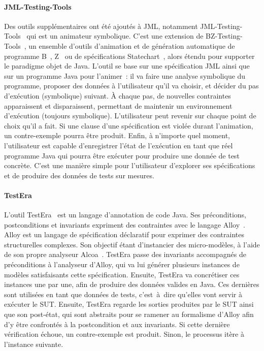 \paragraph{JML-Testing-Tools} Des outils supplémentaires ont été ajoutés à JML,
notamment JML-Testing-Tools~ qui est un animateur
symbolique. C'est une extension de BZ-Testing-Tools~, un
ensemble d'outils d'animation et de génération automatique de programme
B~, Z~ ou de spécifications
Statechart~, alors étendu pour supporter le paradigme objet de
Java. L'outil se base sur une spécification JML ainsi que sur un programme Java
pour l'animer~: il va faire une analyse symbolique du programme, proposer des
données à l'utilisateur qu'il va choisir, et décider du pas d'exécution
(symbolique) suivant. À chaque pas, de nouvelles contraintes apparaissent et
disparaissent, permettant de maintenir un environnement d'exécution (toujours
symbolique). L'utilisateur peut revenir sur chaque point de choix qu'il a fait.
Si une clause d'une spécification est violée durant l'animation, un
contre-exemple pourra être produit. Enfin, à n'importe quel moment,
l'utilisateur est capable d'enregistrer l'état de l'exécution en tant que réel
programme Java qui pourra être exécuter pour produire une donnée de test
concrète. C'est une manière simple pour l'utilisateur d'explorer ses
spécifications et de produire des données de tests sur mesures.

\paragraph{TestEra} L'outil TestEra~ est un langage
d'annotation de code Java. Ses préconditions, postconditions et invariants
expriment des contraintes avec le langage Alloy~. Alloy est un
langage de spécification déclaratif pour exprimer des contraintes structurelles
complexes. Son objectif étant d'instancier des micro-modèles, à l'aide de son
propre analyseur Alcoa~. TestEra passe des invariants
accompagnés de préconditions à l'analyseur d'Alloy, qui va lui générer plusieurs
instances de modèles satisfaisants cette spécification. Ensuite, TestEra va
concrétiser ces instances une par une, afin de produire des données valides en
Java. Ces dernières sont utilisées en tant que données de tests, c'est~à~dire
qu'elles vont servir à exécuter le SUT. Ensuite, TestEra regarde les sorties
produites par le SUT ainsi que son post-état, qui sont abstraits pour se ramener
au formalisme d'Alloy afin d'y être confrontés à la postcondition et aux
invariants. Si cette dernière vérification échoue, un contre-exemple est
produit. Sinon, le processus itère à l'instance suivante.

